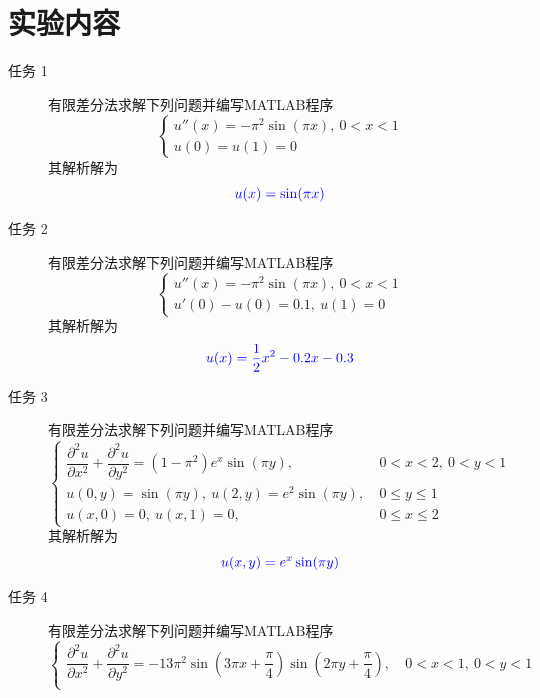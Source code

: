 \documentclass[12pt]{article}
\begin{document}
\section{实验内容}
\begin{description}
    \item[任务 1] 有限差分法求解下列问题并编写MATLAB程序\begin{equation*}
        \begin{cases}
            u''(x)=-\pi^2\sin(\pi x),\ 0<x<1\\
            u(0)=u(1)=0
        \end{cases}
    \end{equation*}其解析解为\begin{equation*}
        \color{blue}u(x)=\sin(\pi x)
    \end{equation*}
    \item[任务 2] 有限差分法求解下列问题并编写MATLAB程序\begin{equation*}
        \begin{cases}
            u''(x)=-\pi^2\sin(\pi x),\ 0<x<1\\
            u'(0)-u(0)=0.1,\ u(1)=0
        \end{cases}
    \end{equation*}其解析解为\begin{equation*}
        \color{blue}u(x)=\dfrac{1}{2}x^2-0.2x-0.3
    \end{equation*}
    \item[任务 3] 有限差分法求解下列问题并编写MATLAB程序\begin{equation*}
        \begin{cases}
            \dfrac{\partial^2u}{\partial x^2}+\dfrac{\partial^2u}{\partial y^2}=(1-\pi^2)e^x\sin(\pi y),\ &0<x<2,\ 0<y<1\\
            u(0,y)=\sin(\pi y),\ u(2,y)=e^2\sin(\pi y),\ &0\leqslant y\leqslant1\\
            u(x,0)=0,\ u(x,1)=0,\ &0\leqslant x\leqslant 2
        \end{cases}
    \end{equation*}其解析解为\begin{equation*}
        \color{blue}u(x,y)=e^x\sin(\pi y)
    \end{equation*}
    \item[任务 4] 有限差分法求解下列问题并编写MATLAB程序\begin{equation*}
        \begin{cases}
            \dfrac{\partial^2u}{\partial x^2}+\dfrac{\partial^2u}{\partial y^2}=-13\pi^2\sin\left(3\pi x+\dfrac{\pi}{4}\right)\sin\left(2\pi y+\dfrac{\pi}{4}\right),\ &0<x<1,\ 0<y<1\\

\end{cases}
\end{equation*}
\end{description}
\end{document}
